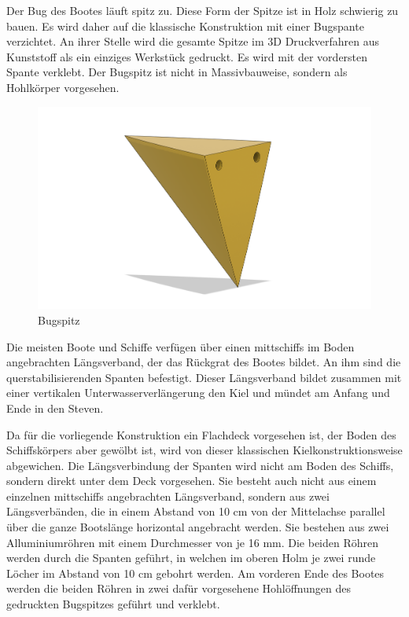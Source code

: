 Der Bug des Bootes läuft spitz zu. Diese Form der Spitze ist in Holz schwierig zu bauen. Es wird daher auf die klassische Konstruktion mit einer Bugspante verzichtet. An ihrer Stelle wird die gesamte Spitze im 3D Druckverfahren aus Kunststoff als ein einziges Werkstück gedruckt. Es wird mit der vordersten Spante verklebt. Der Bugspitz ist nicht in Massivbauweise, sondern als Hohlkörper vorgesehen.
\begin{figure}[H]
    \centering
    \includegraphics[width=0.5\linewidth]{assets/bug_spitz.png}
 \caption{Bugspitz}
    
\end{figure}
Die meisten Boote und Schiffe verfügen über einen mittschiffs im Boden angebrachten Längsverband, der das Rückgrat des Bootes bildet. An ihm sind die querstabilisierenden Spanten befestigt. Dieser Längsverband bildet zusammen mit einer vertikalen Unterwasserverlängerung den Kiel und mündet am Anfang und Ende in den Steven. 

Da für die vorliegende Konstruktion ein Flachdeck vorgesehen ist, der Boden des Schiffskörpers aber gewölbt ist, wird von dieser klassischen Kielkonstruktionsweise abgewichen. Die Längsverbindung der Spanten wird nicht am Boden des Schiffs, sondern direkt unter dem Deck vorgesehen. Sie besteht auch nicht aus einem einzelnen mittschiffs angebrachten Längsverband, sondern aus zwei Längsverbänden, die in einem Abstand von 10 cm von der Mittelachse parallel über die ganze Bootslänge horizontal angebracht werden. Sie bestehen aus zwei Alluminiumröhren mit einem Durchmesser von je 16 mm. Die beiden Röhren werden durch die Spanten geführt, in welchen im oberen Holm je zwei runde Löcher im Abstand von 10 cm gebohrt werden. Am vorderen Ende des Bootes werden die beiden Röhren in zwei dafür vorgesehene Hohlöffnungen des gedruckten Bugspitzes geführt und verklebt.

